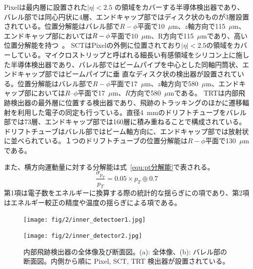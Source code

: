 Pixelは最内層に設置された$|\eta| < 2.5$ の領域をカバーする半導体検出器であり、バレル部では同心円状に4層、エンドキャップ部ではディスク状のものが3層設置されている。位置分解能はバレル部で$R-\phi$平面で10~$\mu$m、$z$軸方向で115~$\mu$m、エンドキャップ部においては$R-\rm{\phi}$平面で10~$\mu$m、R方向で115~$\mu$mであり、高い位置分解能を持つ~\cite{Aad:1129811}。
SCTはPixelの外側に位置されており$|\eta| < 2.5$の領域をカバーしている。マイクロストリップと呼ばれる細長い有感領域をシリコン上に施した半導体検出器であり、バレル部ではビームパイプを中心とした同軸円筒状、エンドキャップ部ではビームパイプに垂
直なディスク状の検出器が設置されている。位置分解能はバレル部で$R-\phi$平面で17~$\mu$m、$z$軸方向で580~$\mu$m、エンドキャップ部においては$R$--$\phi$平面で17~$\mu$m、$R$方向で580~$\mu$mである\cite{Aad:1129811}。
TRTは内部飛跡検出器の最外層に位置する検出器であり、飛跡のトラッキングのほかに遷移輻射を利用した電子の同定も行っている。直径4~mmのドリフトチューブをバレル部では73層、エンドキャップ部では160層に積み重ねることで構成されている。ドリフトチューブはバレル部ではビーム軸方向に、エンドキャップ部では放射状に並べられている。１つのドリフトチューブの位置分解能は$R-\phi$平面で130~$\mu$m である。

また、横方向運動量に対する分解能は式~\eqref{equ:pt分解能}で表される。
\begin{equation}
    \frac{\sigma_{p_{T}}}{p_{T}} = 0.05\times p_{T}\oplus 0.7 
　\label{equ:pt分解能}
\end{equation}
第1項は電子数をエネルギーに換算する際の統計的な揺らぎにの項であり、第2項はエネルギー較正の精度や温度の揺らぎによる項である。

\begin{figure}
    \centering
    \begin{minipage}[b]{0.4\linewidth}
        \centering
        \hspace*{-1cm}
        \texttt{[image: fig/2/inner\_detectoer1.jpg]}
        \vspace{10pt}
        \subcaption{}
        \label{fig:内部飛跡検出器の概略図1}
    \end{minipage}
    \hfill
    \begin{minipage}[b]{0.5\linewidth}
        \centering
        \texttt{[image: fig/2/inner\_detector2.jpg]}
        \vspace{10pt}
        \subcaption{}
        \label{fig:内部飛跡検出器の概略図2}
    \end{minipage}
    \caption{内部飛跡検出器の全体像及び断面図。(a): 全体像\cite{Aad:1129811}、(b): バレル部の断面図\cite{Collaboration:2723878}。内側から順に Pixel, SCT, TRT 検出器が設置されている。}
    \label{fig:内部飛跡検出器}
\end{figure}




